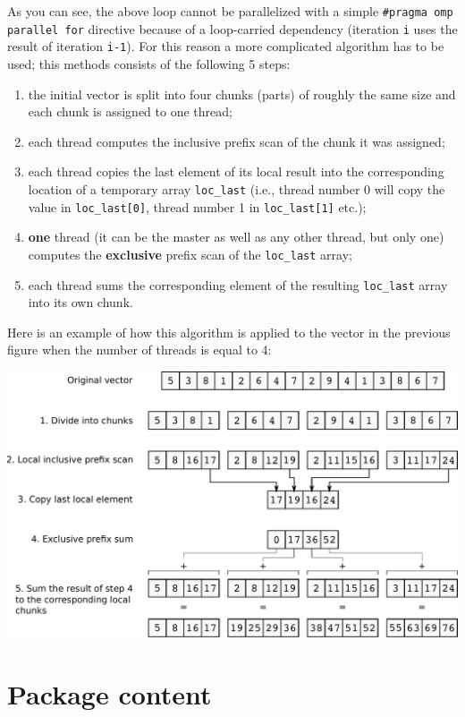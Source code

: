 \documentclass{article}
\begin{document}
As you can see, the above loop cannot be parallelized with a simple
\texttt{\#pragma omp parallel for} directive because of a loop-carried
dependency (iteration \texttt{i} uses the result of iteration
\texttt{i-1}). For this reason a more complicated algorithm has to be
used; this methods consists of the following 5 steps:
\begin{enumerate}
\item the initial vector is split into four chunks (parts) of roughly
  the same size and each chunk is assigned to one thread;
\item each thread computes the inclusive prefix scan of the chunk it
  was assigned;
\item each thread copies the last element of its local result into the
  corresponding location of a temporary array \texttt{loc\_last}
  (i.e., thread number 0 will copy the value in \texttt{loc\_last[0]},
  thread number 1 in \texttt{loc\_last[1]} etc.);
\item {\bf one} thread (it can be the master as well as any other
  thread, but only one) computes the {\bf exclusive} prefix scan of
  the \texttt{loc\_last} array;
\item each thread sums the corresponding element of the resulting
  \texttt{loc\_last} array into its own chunk.
\end{enumerate}

Here is an example of how this algorithm is applied to the vector in
the previous figure when the number of threads is equal to 4:

\vspace{0.3cm}

\noindent\includegraphics[width=\textwidth]{prefscan_par}

\section{Package content}
\end{document}
